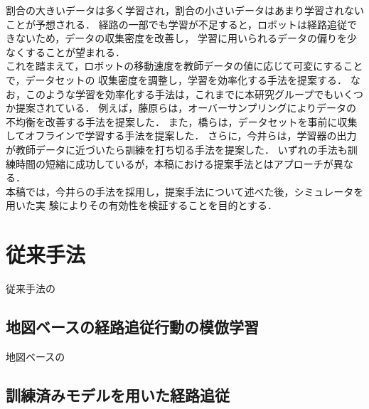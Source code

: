 \documentclass{jarticle}
\begin{document}
割合の大きいデータは多く学習され，割合の小さいデータはあまり学習されないことが予想される．
経路の一部でも学習が不足すると，ロボットは経路追従できないため，データの収集密度を改善し，
学習に用いられるデータの偏りを少なくすることが望まれる．\\
\hspace*{1zw}これを踏まえて，ロボットの移動速度を教師データの値に応じて可変にすることで，データセットの
収集密度を調整し，学習を効率化する手法を提案する．
なお，このような学習を効率化する手法は，これまでに本研究グループでもいくつか提案されている．
例えば，藤原らは，オーバーサンプリングによりデータの不均衡を改善する手法を提案した\cite{fuji}．
また，橋らは，データセットを事前に収集してオフラインで学習する手法を提案した\cite{takahashi}．
さらに，今井らは，学習器の出力が教師データに近づいたら訓練を打ち切る手法を提案した\cite{imai2}．
いずれの手法も訓練時間の短縮に成功しているが，本稿における提案手法とはアプローチが異なる．\\
\hspace*{1zw}本稿では，今井らの手法を採用し，提案手法について述べた後，シミュレータを用いた実
験によりその有効性を検証することを目的とする．


\section{従来手法\protect\\}
従来手法の\\

\subsection{地図ベースの経路追従行動の模倣学習}
地図ベースの\\

\subsection{訓練済みモデルを用いた経路追従}
\end{document}
